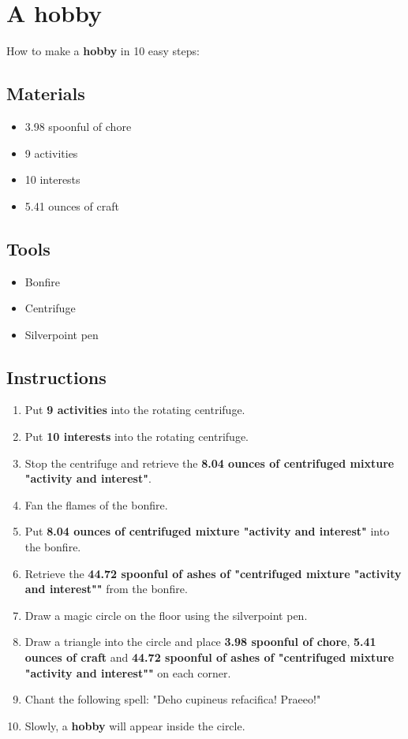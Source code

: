 \documentclass{article}
\begin{document}
\section{A hobby}How to make a \textbf{hobby} in 10 easy steps:

\subsection{Materials}\begin{itemize}
\item 
3.98 spoonful of chore
\item 
9 activities
\item 
10 interests
\item 
5.41 ounces of craft
\end{itemize}
\subsection{Tools}\begin{itemize}
\item 
Bonfire
\item 
Centrifuge
\item 
Silverpoint pen
\end{itemize}
\subsection{Instructions}\begin{enumerate}
\item 
Put \textbf{9 activities} into the rotating centrifuge.
\item 
Put \textbf{10 interests} into the rotating centrifuge.
\item 
Stop the centrifuge and retrieve the \textbf{8.04 ounces of centrifuged mixture "activity and interest"}.
\item 
Fan the flames of the bonfire.
\item 
Put \textbf{8.04 ounces of centrifuged mixture "activity and interest"} into the bonfire.
\item 
Retrieve the \textbf{44.72 spoonful of ashes of "centrifuged mixture "activity and interest""} from the bonfire.
\item 
Draw a magic circle on the floor using the silverpoint pen.
\item 
Draw a triangle into the circle and place \textbf{3.98 spoonful of chore}, \textbf{5.41 ounces of craft} and \textbf{44.72 spoonful of ashes of "centrifuged mixture "activity and interest""} on each corner.
\item 
Chant the following spell: "Deho cupineus refacifica! Praeeo!"
\item 
Slowly, a \textbf{hobby} will appear inside the circle.
\end{enumerate}
\newpage
\end{document}
